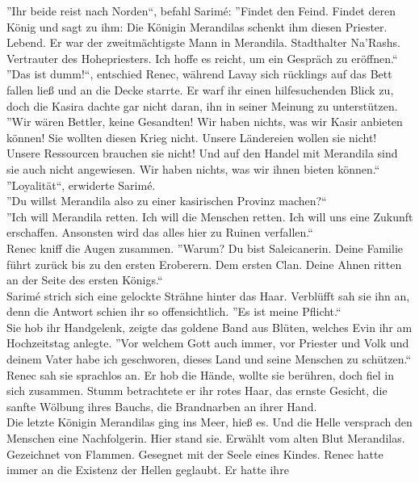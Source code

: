 ''Ihr beide reist nach Norden``, befahl Sarimé: ''Findet den Feind. Findet deren König und 
sagt zu ihm: Die Königin Merandilas schenkt ihm diesen Priester. Lebend. Er war der zweitmächtigste 
Mann in Merandila. Stadthalter Na'Rashs. Vertrauter des Hohepriesters. Ich hoffe es reicht, um ein 
Gespräch zu eröffnen.``\\
''Das ist dumm!``, entschied Renec, während Lavay sich rücklings auf das Bett fallen ließ und an 
die Decke starrte. Er warf ihr einen hilfesuchenden Blick zu, doch die Kasira dachte gar nicht 
daran, ihn in seiner Meinung zu unterstützen.\\
''Wir wären Bettler, keine Gesandten! Wir haben nichts, was wir Kasir anbieten können! Sie wollten 
diesen Krieg nicht. Unsere Ländereien wollen sie nicht! Unsere Ressourcen brauchen sie nicht! Und 
auf den Handel mit Merandila sind sie auch nicht angewiesen. Wir haben nichts, was wir ihnen bieten können.``\\
''Loyalität``, erwiderte Sarimé.\\
''Du willst Merandila also zu einer kasirischen Provinz machen?``\\
''Ich will Merandila retten. Ich will die Menschen retten. Ich will uns eine Zukunft erschaffen. 
Ansonsten wird das alles hier zu Ruinen verfallen.``\\
Renec kniff die Augen zusammen. ''Warum? Du bist Saleicanerin. Deine Familie führt zurück bis zu 
den ersten Eroberern. Dem ersten Clan. Deine Ahnen ritten an der Seite des ersten Königs.``\\
Sarimé strich sich eine gelockte Strähne hinter das Haar. Verblüfft sah sie ihn an, denn die 
Antwort schien ihr so offensichtlich. ''Es ist meine Pflicht.``\\
Sie hob ihr Handgelenk, zeigte das goldene Band aus Blüten, welches Evin ihr am Hochzeitstag 
anlegte. ''Vor welchem Gott auch immer, vor Priester und Volk und deinem Vater habe ich geschworen, 
dieses Land und seine Menschen zu schützen.``\\
Renec sah sie sprachlos an. Er hob die Hände, wollte sie berühren, doch fiel in sich zusammen. 
Stumm betrachtete er ihr rotes Haar, das ernste Gesicht, die sanfte Wölbung ihres Bauchs, die 
Brandnarben an ihrer Hand.\\
Die letzte Königin Merandilas ging ins Meer, hieß es. Und die Helle versprach den Menschen eine 
Nachfolgerin. Hier stand sie. Erwählt vom alten Blut Merandilas. Gezeichnet von Flammen. Gesegnet 
mit der Seele eines Kindes. Renec hatte immer an die Existenz der Hellen geglaubt. Er hatte ihre 
